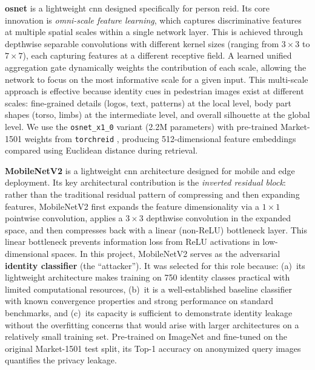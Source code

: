 \textbf{\acrlong{osnet}} \cite{zhou2019osnet} is a lightweight \acrshort{cnn} designed specifically for person \acrshort{reid}. Its core innovation is \textit{omni-scale feature learning}, which captures discriminative features at multiple spatial scales within a single network layer. This is achieved through depthwise separable convolutions with different kernel sizes (ranging from $3\times3$ to $7\times7$), each capturing features at a different receptive field. A learned unified aggregation gate dynamically weights the contribution of each scale, allowing the network to focus on the most informative scale for a given input. This multi-scale approach is effective because identity cues in pedestrian images exist at different scales: fine-grained details (logos, text, patterns) at the local level, body part shapes (torso, limbs) at the intermediate level, and overall silhouette at the global level. We use the \texttt{osnet\_x1\_0} variant (2.2M parameters) with pre-trained Market-1501 weights from \texttt{torchreid} \cite{zhou2019torchreid}, producing 512-dimensional feature embeddings compared using Euclidean distance during retrieval.

\textbf{MobileNetV2} \cite{sandler2018mobilenetv2} is a lightweight \acrshort{cnn} architecture designed for mobile and edge deployment. Its key architectural contribution is the \textit{inverted residual block}: rather than the traditional residual pattern of compressing and then expanding features, MobileNetV2 first expands the feature dimensionality via a $1\times1$ pointwise convolution, applies a $3\times3$ depthwise convolution in the expanded space, and then compresses back with a linear (non-ReLU) bottleneck layer. This linear bottleneck prevents information loss from ReLU activations in low-dimensional spaces. In this project, MobileNetV2 serves as the adversarial \textbf{identity classifier} (the ``attacker''). It was selected for this role because: (a)~its lightweight architecture makes training on 750 identity classes practical with limited computational resources, (b)~it is a well-established baseline classifier with known convergence properties and strong performance on standard benchmarks, and (c)~its capacity is sufficient to demonstrate identity leakage without the overfitting concerns that would arise with larger architectures on a relatively small training set. Pre-trained on ImageNet \cite{deng2009imagenet} and fine-tuned on the original Market-1501 test split, its Top-1 accuracy on anonymized query images quantifies the privacy leakage.


